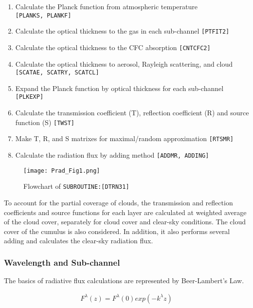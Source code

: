 \begin{enumerate}
\def\labelenumi{\arabic{enumi}.}
\tightlist
\item
  Calculate the Planck function from atmospheric temperature
  \texttt{{[}PLANKS,\ PLANKF{]}}
\item
  Calculate the optical thickness to the gas in each sub-channel
  \texttt{{[}PTFIT2{]}}
\item
  Calculate the optical thickness to the CFC absorption
  \texttt{{[}CNTCFC2{]}}
\item
  Calculate the optical thickness to aerosol, Rayleigh scattering, and
  cloud \texttt{{[}SCATAE,\ SCATRY,\ SCATCL{]}}
\item
  Expand the Planck function by optical thickness for each sub-channel
  \texttt{{[}PLKEXP{]}}
\item
  Calculate the transmission coefficient (T), reflection coefficient (R)
  and source function (S) \texttt{{[}TWST{]}}
\item
  Make T, R, and S matrixes for maximal/random approximation
  \texttt{{[}RTSMR{]}}
\item
  Calculate the radiation flux by adding method
  \texttt{{[}ADDMR,\ ADDING{]}}
\end{enumerate}

\begin{figure}
\centering
\texttt{[image: Prad\_Fig1.png]}
\caption{Flowchart of \texttt{SUBROUTINE:{[}DTRN31{]}}}
\end{figure}

To account for the partial coverage of clouds, the transmission and
reflection coefficients and source functions for each layer are
calculated at weighted average of the cloud cover, separately for cloud
cover and clear-sky conditions. The cloud cover of the cumulus is also
considered. In addition, it also performs several adding and calculates
the clear-sky radiation flux.

\hypertarget{wavelength-and-sub-channel}{%
\subsubsection{Wavelength and
Sub-channel}\label{wavelength-and-sub-channel}}

The basics of radiative flux calculations are represented by
Beer-Lambert's Law.

\begin{eqnarray}
  F^\lambda(z) = F^\lambda(0) exp (-k^\lambda z)
\end{eqnarray}

